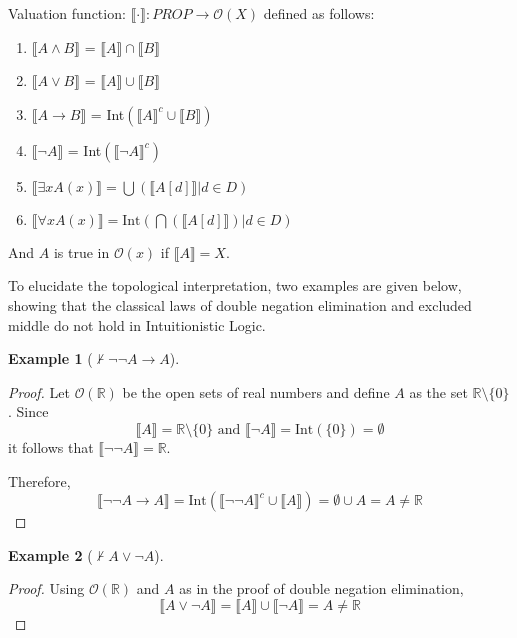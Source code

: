 \documentclass[12pt,a4paper]{article}
\theoremstyle{definition}
\newtheorem{example}{Example}[section]
\begin{document}
Valuation function: $\llbracket \cdot \rrbracket : PROP \longrightarrow \mathcal{O}(X)$ defined as follows:
\begin{enumerate}
    \item $\llbracket A \land B \rrbracket$ = $\llbracket A \rrbracket \cap \llbracket B \rrbracket$
    \item $\llbracket A \lor B \rrbracket$ = $\llbracket A \rrbracket \cup \llbracket B \rrbracket$
    \item $\llbracket A \to B \rrbracket$ = Int$\left(\llbracket A \rrbracket^c \cup \llbracket B \rrbracket \right)$
    \item $\llbracket \neg A \rrbracket$ = Int$\left(\llbracket \neg A \rrbracket^c \right)$
    \item $\llbracket \exists x A(x) \rrbracket = \bigcup \left( \llbracket A[d] \rrbracket | d \in D \right)$
    \item $\llbracket \forall x A(x) \rrbracket = \text{Int}\left(\bigcap \left(\llbracket A[d] \rrbracket \right) | d \in D \right)$
\end{enumerate}
And $A$ is true in $\mathcal{O}(x)$ if $\llbracket A \rrbracket = X$.

To elucidate the topological interpretation, two examples are given below, showing that the classical laws of double negation elimination and excluded middle do not hold in Intuitionistic Logic.

\label{DNE}
\begin{example}[$\not\vdash \neg \neg A \to A$] \hfill
    \begin{proof}
    Let $\mathcal{O}(\mathbb{R})$ be the open sets of real numbers and define $A$ as the set $\mathbb{R} \setminus \{ 0 \}$. Since
    \[ \llbracket A \rrbracket = \mathbb{R} \setminus \{ 0 \} \text{ and } \llbracket \neg A \rrbracket = \text{Int}(\{ 0 \}) = \emptyset \]
    it follows that $\llbracket \neg \neg A \rrbracket = \mathbb{R}$.

    Therefore, \[ \llbracket \neg \neg A \to A \rrbracket = \text{Int}(\llbracket \neg \neg A \rrbracket^c \cup \llbracket A \rrbracket) = \emptyset \cup A = A \neq \mathbb{R} \]
    \end{proof}
\end{example}

\begin{example}[$\not\vdash A \lor \neg A$] \hfill \label{LEM}
\begin{proof}
    Using $\mathcal{O}(\mathbb{R})$ and $A$ as in the proof of double negation elimination,
    \[ \llbracket A \lor \neg A \rrbracket = \llbracket A \rrbracket \cup \llbracket \neg A \rrbracket = A \neq \mathbb{R} \]
\end{proof}
\end{example}
\end{document}
